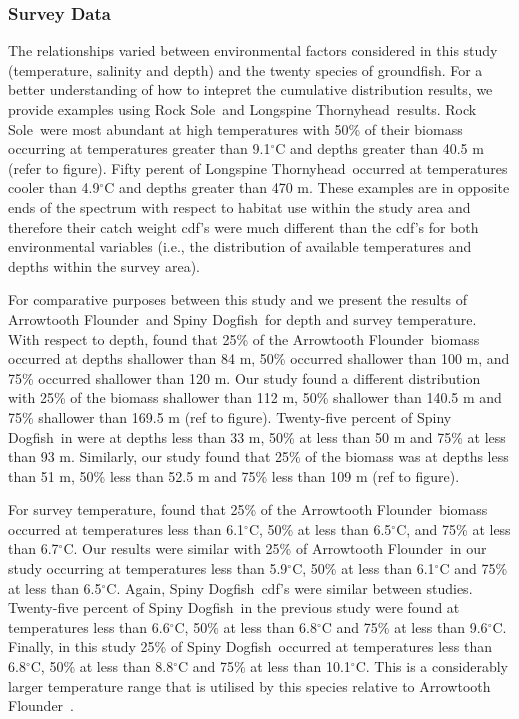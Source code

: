 \documentclass[11pt]{book}\usepackage[]{graphicx}\usepackage[]{color}
\newcommand{\fishnameARF}{Arrowtooth Flounder}
\newcommand{\fishnameDOG}{Spiny Dogfish}
\newcommand{\fishnameLST}{Longspine Thornyhead}
\newcommand{\fishnameROL}{Rock Sole}
\begin{document}
\subsubsection{Survey Data}
The relationships varied between environmental factors considered in this study (temperature, salinity and depth) and the twenty species of groundfish. For a better understanding of how to intepret the cumulative distribution results, we provide examples using \fishnameROL\  and \fishnameLST\ results. \fishnameROL\ were most abundant at high temperatures with 50\% of their biomass occurring at temperatures greater than 9.1$^\circ$C and depths greater than 40.5 m (refer to figure). Fifty perent  of \fishnameLST\ occurred at temperatures cooler than 4.9$^\circ$C and depths greater than 470 m. These examples are in opposite ends of the spectrum with respect to habitat use within the study area and therefore their catch weight cdf's were much different than the cdf's for both environmental variables (i.e., the distribution of available temperatures and depths within the survey area).

For comparative purposes between this study and \citet{psf94} we present the results of \fishnameARF\ and \fishnameDOG\ for depth and survey temperature. With respect to depth, \citet{psf94} found that 25\% of the \fishnameARF\ biomass occurred at depths shallower than 84 m, 50\% occurred shallower than 100 m, and 75\% occurred shallower than 120 m. Our study found a different distribution with 25\% of the biomass shallower than 112 m, 50\% shallower than 140.5 m and 75\% shallower than 169.5 m (ref to figure). Twenty-five percent of \fishnameDOG\ in \citet{psf94} were at depths less than 33 m, 50\% at less than 50 m and 75\% at less than 93 m. Similarly, our study found that 25\% of the biomass was at depths less than 51 m, 50\% less than 52.5 m and 75\% less than 109 m (ref to figure).

For survey temperature, \citet{psf94} found that 25\% of the \fishnameARF\ biomass occurred at temperatures less than 6.1$^\circ$C, 50\% at less than 6.5$^\circ$C, and 75\% at less than 6.7$^\circ$C. Our results were similar with 25\% of \fishnameARF\ in our study occurring at temperatures less than 5.9$^\circ$C, 50\% at less than 6.1$^\circ$C and 75\% at less than 6.5$^\circ$C. Again, \fishnameDOG\  cdf's were similar between studies. Twenty-five percent of \fishnameDOG\ in the previous study were found at temperatures less than 6.6$^\circ$C, 50\% at less than 6.8$^\circ$C and 75\% at less than 9.6$^\circ$C. Finally, in this study 25\% of \fishnameDOG\ occurred at temperatures less than 6.8$^\circ$C, 50\% at less than 8.8$^\circ$C and 75\% at less than 10.1$^\circ$C. This is a considerably larger temperature range that is utilised by this species relative to \fishnameARF\ . 
\end{document}

